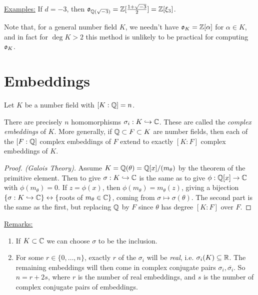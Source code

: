 \documentclass[10pt,a4paper]{article}
\begin{document}
\underline{Examples:} If $d = -3$, then $\mathfrak{o}_{\mathbb{Q}(\sqrt{-3})} = \mathbb{Z}[\frac{1+\sqrt{-3}}{2}] = \mathbb{Z}[\xi_3]$.

Note that, for a general number field $K$, we needn't have $\mathfrak{o}_K = \mathbb{Z}[\alpha]$ for $\alpha \in K$, and in fact for $\deg K > 2$ this method is unlikely to be practical for computing $\mathfrak{o}_K$.

\section{Embeddings}
Let $K$ be a number field with $[K:\mathbb{Q}] = n$.

\begin{theorem}
There are precisely $n$ homomorphisms $\sigma_i:K \hookrightarrow \mathbb{C}$. These are called the \emph{complex embeddings} of $K$. More generally, if $\mathbb{Q}\subset F\subset K$ are number fields, then each of the $[F:\mathbb{Q}]$ complex embeddings of $F$ extend to exactly $[K:F]$ complex embeddings of $K$.
\end{theorem}
\begin{proof}[Proof. (Galois Theory)]
Assume $K = \mathbb{Q}(\theta) = \mathbb{Q}[x]/(m_\theta)$ by the theorem of the primitive element. Then to give $\sigma: K \hookrightarrow \mathbb{C}$ is the same as to give $\phi:\mathbb{Q}[x]\to \mathbb{C}$ with $\phi(m_{\theta}) = 0$. If $z = \phi(x)$, then $\phi(m_\theta) = m_\theta(z)$, giving a bijection $\{\sigma:K \hookrightarrow \mathbb{C}\} \leftrightarrow \{$roots of $m_{\theta} \in \mathbb{C}\}$, coming from $\sigma \mapsto \sigma(\theta)$. The second part is the same as the first, but replacing $\mathbb{Q}$ by $F$ since $\theta$ has degree $[K:F]$ over $F$.
\end{proof}

\underline{Remarks:}
\begin{enumerate}
\item If $K \subset \mathbb{C}$ we can choose $\sigma$ to be the inclusion.
\item For some $r \in \{0, \ldots, n\}$, exactly $r$ of the $\sigma_{i}$ will be \emph{real}, i.e. $\sigma_{i}(K) \subseteq \mathbb{R}$. The remaining embeddings will then come in complex conjugate pairs $\sigma_i, \overline{\sigma_i}$. So $n = r+2s$, where $r$ is the number of real embeddings, and $s$ is the number of complex conjugate pairs of embeddings.
\end{enumerate}\newpage
\end{document}

